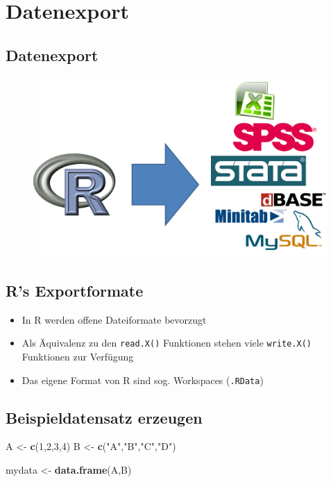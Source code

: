 \documentclass[]{article}
\newenvironment{Shaded}{\begin{snugshade}}{\end{snugshade}}
\newcommand{\KeywordTok}[1]{\textcolor[rgb]{0.13,0.29,0.53}{\textbf{{#1}}}}
\newcommand{\DecValTok}[1]{\textcolor[rgb]{0.00,0.00,0.81}{{#1}}}
\newcommand{\StringTok}[1]{\textcolor[rgb]{0.31,0.60,0.02}{{#1}}}
\newcommand{\NormalTok}[1]{{#1}}
\providecommand{\tightlist}{%
  \setlength{\itemsep}{0pt}\setlength{\parskip}{0pt}}
\begin{document}
\section{Datenexport}\label{datenexport}

\subsection{Datenexport}\label{datenexport-1}

\begin{figure}[htbp]
\centering
\includegraphics{figure/Datenexport.PNG}
\caption{}
\end{figure}

\subsection{R's Exportformate}\label{rs-exportformate}

\begin{itemize}
\tightlist
\item
  In R werden offene Dateiformate bevorzugt
\item
  Als Äquivalenz zu den \texttt{read.X()} Funktionen stehen viele
  \texttt{write.X()} Funktionen zur Verfügung
\item
  Das eigene Format von R sind sog. Workspaces (\texttt{.RData})
\end{itemize}

\subsection{Beispieldatensatz
erzeugen}\label{beispieldatensatz-erzeugen}

\begin{Shaded}
\begin{Highlighting}[]
\NormalTok{A <-}\StringTok{ }\KeywordTok{c}\NormalTok{(}\DecValTok{1}\NormalTok{,}\DecValTok{2}\NormalTok{,}\DecValTok{3}\NormalTok{,}\DecValTok{4}\NormalTok{)}
\NormalTok{B <-}\StringTok{ }\KeywordTok{c}\NormalTok{(}\StringTok{"A"}\NormalTok{,}\StringTok{"B"}\NormalTok{,}\StringTok{"C"}\NormalTok{,}\StringTok{"D"}\NormalTok{)}

\NormalTok{mydata <-}\StringTok{ }\KeywordTok{data.frame}\NormalTok{(A,B)}
\end{Highlighting}
\end{Shaded}
\end{document}
